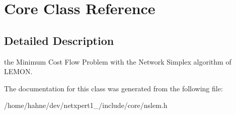 \hypertarget{classCore}{}\section{Core Class Reference}
\label{classCore}


\subsection{Detailed Description}
the Minimum Cost Flow Problem with the Network Simplex algorithm of L\+E\+M\+ON. 

The documentation for this class was generated from the following file\+:\begin{DoxyCompactItemize}
\item 
/home/hahne/dev/netxpert1\+\_/include/core/nslem.\+h\end{DoxyCompactItemize}
